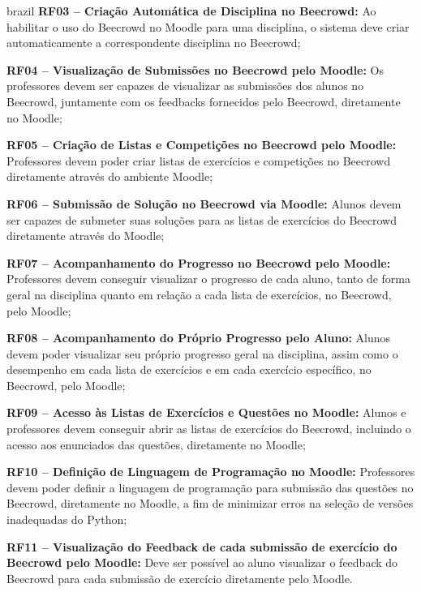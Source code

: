 \begin{otherlanguage*}{brazil}
    \textbf{RF03 – Criação Automática de Disciplina no Beecrowd:} Ao habilitar o uso do Beecrowd no Moodle para uma disciplina, o sistema deve criar automaticamente a correspondente disciplina no Beecrowd;

    \vspace{12pt}

    \textbf{RF04 – Visualização de Submissões no Beecrowd pelo Moodle:} Os professores devem ser capazes de visualizar as submissões dos alunos no Beecrowd, juntamente com os feedbacks fornecidos pelo Beecrowd, diretamente no Moodle;

    \vspace{12pt}

    \textbf{RF05 – Criação de Listas e Competições no Beecrowd pelo Moodle:} Professores devem poder criar listas de exercícios e competições no Beecrowd diretamente através do ambiente Moodle;

    \vspace{12pt}

    \textbf{RF06 – Submissão de Solução no Beecrowd via Moodle:} Alunos devem ser capazes de submeter suas soluções para as listas de exercícios do Beecrowd diretamente através do Moodle;

    \vspace{12pt}

    \textbf{RF07 – Acompanhamento do Progresso no Beecrowd pelo Moodle:} Professores devem conseguir visualizar o progresso de cada aluno, tanto de forma geral na disciplina quanto em relação a cada lista de exercícios, no Beecrowd, pelo Moodle;

    \vspace{12pt}

    \textbf{RF08 – Acompanhamento do Próprio Progresso pelo Aluno:} Alunos devem poder visualizar seu próprio progresso geral na disciplina, assim como o desempenho em cada lista de exercícios e em cada exercício específico, no Beecrowd, pelo Moodle;

    \vspace{12pt}

    \textbf{RF09 – Acesso às Listas de Exercícios e Questões no Moodle:} Alunos e professores devem conseguir abrir as listas de exercícios do Beecrowd, incluindo o acesso aos enunciados das questões, diretamente no Moodle;

    \vspace{12pt}

    \textbf{RF10 – Definição de Linguagem de Programação no Moodle:} Professores devem poder definir a linguagem de programação para submissão das questões no Beecrowd, diretamente no Moodle, a fim de minimizar erros na seleção de versões inadequadas do Python;

    \vspace{12pt}

    \textbf{RF11 – Visualização do Feedback de cada submissão de exercício do Beecrowd pelo Moodle:} Deve ser possível ao aluno visualizar o feedback do Beecrowd para cada submissão de exercício diretamente pelo Moodle.

\end{otherlanguage*}

